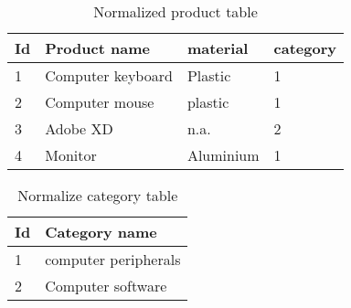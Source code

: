 \begin{table}[H]
\begin{tabular}{ | l | l | l | l |}
    \toprule
    \textbf{Id}     & \textbf{Product name} & \textbf{material}     & \textbf{category}  \\
    \midrule
    1               & Computer keyboard     & Plastic                   & 1     \\
    \midrule
    2               & Computer mouse        & plastic                   & 1     \\
    \midrule
    3               & Adobe XD              & n.a.                      & 2     \\
    \midrule
    4               & Monitor               & Aluminium                 & 1     \\
    \bottomrule
\end{tabular}
\centering
\captionsetup{justification=centering}
\caption{Normalized product table}
\label{tab:normalized-product}
\end{table}

\begin{table}[H]
\begin{tabular}{ | l | l |}
    \toprule
    \textbf{Id}     & \textbf{Category name}\\
    \midrule
    1               & computer peripherals  \\
    \midrule
    2               & Computer software     \\
    \midrule
    \bottomrule
\end{tabular}
\centering
\captionsetup{justification=centering}
\caption{Normalize category table}
\label{tab:normalized-category}
\end{table}
